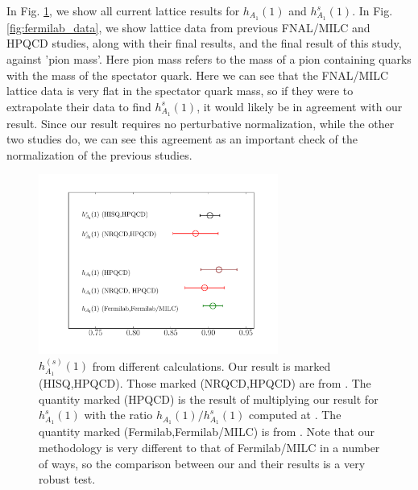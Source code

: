 In Fig. \ref{fig:comparison_BsDsstar}, we show all current lattice results for $h_{A_1}(1)$ and $h_{A_1}^s(1)$. In Fig. \ref{fig:fermilab_data}, we show lattice data from previous FNAL/MILC and HPQCD studies, along with their final results, and the final result of this study, against 'pion mass'. Here pion mass refers to the mass of a pion containing quarks with the mass of the spectator quark. Here we can see that the FNAL/MILC lattice data is very flat in the spectator quark mass, so if they were to extrapolate their data to find $h^s_{A_1}(1)$, it would likely be in agreement with our result. Since our result requires no perturbative normalization, while the other two studies do, we can see this agreement as an important check of the normalization of the previous studies.

\begin{figure}[htb!]
  \begin{center}
  \hspace{-20pt}
  \includegraphics[width=0.7\textwidth]{images/BsDsstar/comparisons.pdf}
  \caption{ $h_{A_1}^{(s)}(1)$ from different calculations. Our result is marked (HISQ,HPQCD). Those marked (NRQCD,HPQCD) are from \cite{Harrison:2017fmw}. The quantity marked (HPQCD) is the result of multiplying our result for $h^s_{A_1}(1)$ with the ratio $h_{A_1}(1)/h^s_{A_1}(1)$ computed at \cite{Harrison:2017fmw}. The quantity marked (Fermilab,Fermilab/MILC) is from \cite{Bailey:2014tva}. Note that our methodology is very different to that of Fermilab/MILC in a number of ways, so the comparison between our and their results is a very robust test. \label{fig:comparison_BsDsstar}}
  \end{center}
\end{figure}

